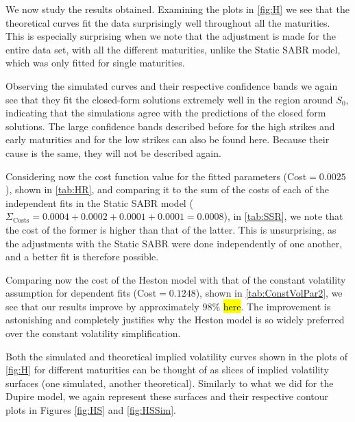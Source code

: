 We now study the results obtained. Examining the plots in \autoref{fig:H} we see that the theoretical curves fit the data surprisingly well throughout all the maturities.
This is especially surprising when we note that the adjustment is made for the entire data set, with all the different maturities, unlike the Static SABR model, which was only fitted for single maturities.

Observing the simulated curves and their respective confidence bands we again see that they fit the closed-form solutions extremely well in the region around $S_0$, indicating that the simulations agree with the predictions of the closed form solutions. The large confidence bands described before for the high strikes and early maturities and for the low strikes can also be found here. Because their cause is the same, they will not be described again.

Considering now the cost function value for the fitted parameters (Cost$=0.0025$), shown in \autoref{tab:HR}, and comparing it to the sum of the costs of each of the independent fits in the Static SABR model ($\Sigma_{\mathrm{Costs}}=0.0004+0.0002+0.0001+0.0001=0.0008$), in \autoref{tab:SSR}, we note that the cost of the former is higher than that of the latter.
This is unsurprising, as the adjustments with the Static SABR were done independently of one another, and a better fit is therefore possible.

Comparing now the cost of the Heston model with that of the constant volatility assumption for dependent fits (Cost$=0.1248$), shown in \autoref{tab:ConstVolPar2}, we see that our results improve by approximately $98\%$ \hl{here}. The improvement is astonishing and completely justifies why the Heston model is so widely preferred over the constant volatility simplification.


Both the simulated and theoretical implied volatility curves shown in the plots of \autoref{fig:H} for different maturities can be thought of as slices of implied volatility surfaces (one simulated, another theoretical). Similarly to what we did for the Dupire model, we again represent these surfaces and their respective contour plots in Figures \ref{fig:HS} and \ref{fig:HSSim}.


